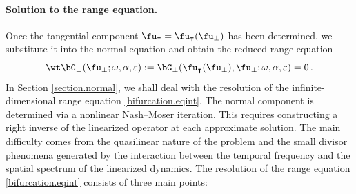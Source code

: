 \documentclass[a4paper,reqno,10pt]{article}
\begin{document}
\paragraph{Solution to the range equation.}
Once the tangential component $\fu_\intercal = \fu_{\intercal}(\fu_\perp)$ has been determined, we substitute it into the
normal equation and obtain the reduced range equation
\begin{equation}\label{bifurcation.eqint}
	\wt\bG_{\perp}(\fu_{\perp};\omega,\alpha,\varepsilon)
	:=
	\bG_{\perp}(\fu_{\intercal}(\fu_{\perp}),\fu_{\perp};\omega,\alpha,\varepsilon)
	=0 \,.
\end{equation}
In Section \ref{section.normal}, we shall deal with   the resolution of the infinite-dimensional range equation \eqref{bifurcation.eqint}. 
The normal component is determined via a nonlinear Nash--Moser iteration. This requires constructing a right inverse of the linearized operator at each approximate solution. The main difficulty comes from the quasilinear nature of the problem and the small divisor phenomena generated by the interaction between the temporal frequency and the spatial spectrum of the linearized dynamics.  
The resolution of the range equation \eqref{bifurcation.eqint} consists of three main points:
\end{document}

